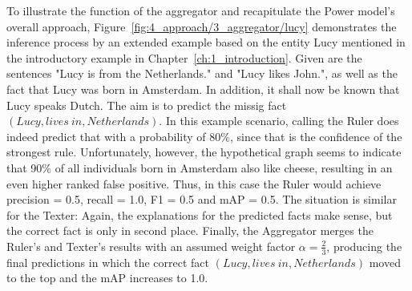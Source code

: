 To illustrate the function of the aggregator and recapitulate the Power model's overall approach, Figure~\ref{fig:4_approach/3_aggregator/lucy} demonstrates the inference process by an extended example based on the entity Lucy mentioned in the introductory example in Chapter~\ref{ch:1_introduction}. Given are the sentences "Lucy is from the Netherlands." and "Lucy likes John.", as well as the fact that Lucy was born in Amsterdam. In addition, it shall now be known that Lucy speaks Dutch. The aim is to predict the missig fact $(Lucy, lives~in, Netherlands)$. In this example scenario, calling the Ruler does indeed predict that with a probability of 80\%, since that is the confidence of the strongest rule. Unfortunately, however, the hypothetical graph seems to indicate that 90\% of all individuals born in Amsterdam also like cheese, resulting in an even higher ranked false positive. Thus, in this case the Ruler would achieve precision = 0.5, recall = 1.0, F1 = 0.5 and mAP = 0.5. The situation is similar for the Texter: Again, the explanations for the predicted facts make sense, but the correct fact is only in second place. Finally, the Aggregator merges the Ruler's and Texter's results with an assumed weight factor $\alpha = \frac{2}{3}$, producing the final predictions in which the correct fact $(Lucy, lives~in, Netherlands)$ moved to the top and the mAP increases to 1.0.
